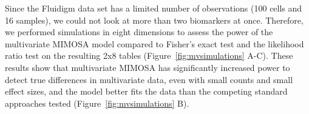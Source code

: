 \documentclass[12pt,oupdraft]{biostatistics}
\begin{document}
%

Since the Fluidigm data set has a limited number of observations (100 cells and 16 samples), we could not look at more than two biomarkers at once. Therefore, we performed simulations in eight dimensions to assess the power of the multivariate MIMOSA  model compared to Fisher's exact test and the likelihood ratio test on the resulting 2x8 tables (Figure~\ref{fig:mvsimulations} A-C). These results show that multivariate MIMOSA has significantly increased power to detect true differences in multivariate data, even with small counts and small effect sizes, and the model better fits the data than the competing standard approaches tested (Figure~\ref{fig:mvsimulations} B).
\end{document}
